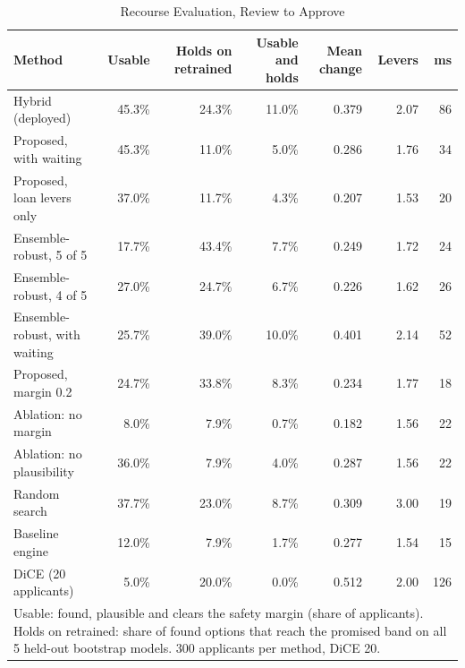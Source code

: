 \begin{table}[t]
\caption{Recourse Evaluation, Review to Approve}
\label{tab:recourse_review_to_approve}
\centering
\setlength{\tabcolsep}{4pt}
\begin{tabular}{lrrrrrr}
\hline
\textbf{Method} & \textbf{Usable} & \textbf{Holds on retrained} & \textbf{Usable and holds} & \textbf{Mean change} & \textbf{Levers} & \textbf{ms} \\
\hline
Hybrid (deployed) & 45.3\% & 24.3\% & 11.0\% & 0.379 & 2.07 & 86 \\
Proposed, with waiting & 45.3\% & 11.0\% & 5.0\% & 0.286 & 1.76 & 34 \\
Proposed, loan levers only & 37.0\% & 11.7\% & 4.3\% & 0.207 & 1.53 & 20 \\
Ensemble-robust, 5 of 5 & 17.7\% & 43.4\% & 7.7\% & 0.249 & 1.72 & 24 \\
Ensemble-robust, 4 of 5 & 27.0\% & 24.7\% & 6.7\% & 0.226 & 1.62 & 26 \\
Ensemble-robust, with waiting & 25.7\% & 39.0\% & 10.0\% & 0.401 & 2.14 & 52 \\
Proposed, margin 0.2 & 24.7\% & 33.8\% & 8.3\% & 0.234 & 1.77 & 18 \\
Ablation: no margin & 8.0\% & 7.9\% & 0.7\% & 0.182 & 1.56 & 22 \\
Ablation: no plausibility & 36.0\% & 7.9\% & 4.0\% & 0.287 & 1.56 & 22 \\
Random search & 37.7\% & 23.0\% & 8.7\% & 0.309 & 3.00 & 19 \\
Baseline engine & 12.0\% & 7.9\% & 1.7\% & 0.277 & 1.54 & 15 \\
DiCE (20 applicants) & 5.0\% & 20.0\% & 0.0\% & 0.512 & 2.00 & 126 \\
\hline
\multicolumn{7}{p{0.95\linewidth}}{\footnotesize Usable: found, plausible and clears the safety margin (share of applicants). Holds on retrained: share of found options that reach the promised band on all 5 held-out bootstrap models. 300 applicants per method, DiCE 20.} \\
\end{tabular}
\end{table}
